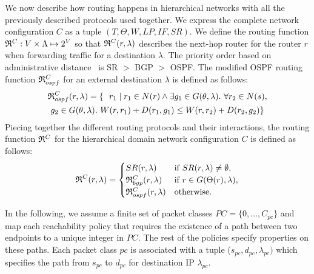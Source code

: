  We now describe how routing
happens in hierarchical networks with all the previously described protocols
used together.
We express the complete network configuration $C$
as a tuple $(T, \Theta,W,LP,IF,SR)$.
We define the routing function 
$\mathfrak{R}^C: V \times \Lambda \mapsto 2^V$ 
so that
$\mathfrak{R}^C(r,\lambda)$
 describes the next-hop router for the 
router $r$ when forwarding traffic for a destination $\lambda$. 
The priority order based on administrative distance~\cite{admindistance} is 
SR $>$ BGP $>$ OSPF. 
\iffull
The modified OSPF routing 
function $\mathfrak{R}^C_{ospf}$ for an external destination $\lambda$
is defined as follows: 
\begin{multline*}
\mathfrak{R}_{ospf}^C(r,\lambda) = \{~~r_1 \mid r_1 \in N(r) \wedge \exists g_1 \in G (\theta, \lambda). ~\forall r_2 \in N(s), \\ g_2 \in G (\theta, \lambda). ~W(r, r_1) + D(r_1, g_1) \leq
W(r, r_2) + D(r_2, g_2)\}
\end{multline*}
\fi
Piecing together the different routing protocols and their 
interactions, the routing function 
$\mathfrak{R}^C$ for the hierarchical domain network configuration $C$ is defined as follows: 
\[
\mathfrak{R}^C(r, \lambda) = 
\begin{cases}
SR(r, \lambda) & \text{if } SR(r, \lambda) \not= \emptyset, \\
\mathfrak{R}_{bgp}^C(r, \lambda) & \text{if }r \in G(\Theta(r), \lambda), \\
\mathfrak{R}_{ospf}^C(r, \lambda) & \text{otherwise.} 
\end{cases}
\]

In the following, we assume a finite set of packet classes $PC = \{0, \ldots, C_{pc}\}$ 
and map each reachability
policy that requires the existence of a path between two endpoints
to a unique integer in $PC$. The rest of the policies specify 
properties on these paths. Each packet class $pc$ is associated
with a tuple ($s_{pc}, d_{pc}, \lambda_{pc})$ which specifies 
the path from $s_{pc}$ to $d_{pc}$ for destination IP $\lambda_{pc}$.

